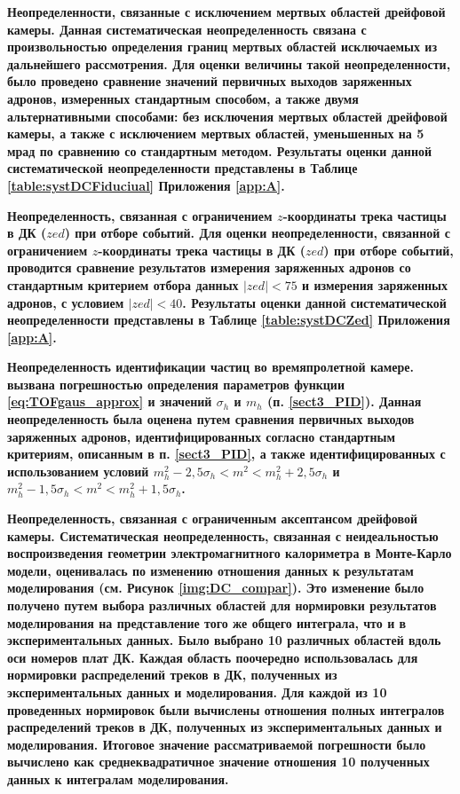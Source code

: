 \bfseries Неопределенности, связанные с исключением мертвых областей дрейфовой камеры. %
\mdseries
Данная систематическая неопределенность связана с произвольностью определения границ мертвых областей исключаемых из дальнейшего рассмотрения. Для оценки величины такой неопределенности, было проведено сравнение значений первичных выходов заряженных адронов, измеренных стандартным способом, а также двумя альтернативными способами: без  исключения мертвых областей дрейфовой камеры, а также с исключением мертвых областей, уменьшенных на 5 мрад по сравнению со стандартным методом. 
Результаты оценки данной систематической неопределенности представлены в Таблице \ref{table:systDCFiduciual} Приложения \ref{app:A}.


\bfseries Неопределенность, связанная с ограничением $z$-координаты трека частицы в ДК ($zed$) при отборе событий. %
\mdseries
Для оценки неопределенности, связанной с ограничением $z$-координаты трека частицы в ДК ($zed$) при отборе событий, проводится сравнение результатов измерения заряженных адронов со стандартным критерием отбора данных $|zed|<75$ и измерения заряженных адронов, с условием $|zed|<40$. 
Результаты оценки данной систематической неопределенности представлены в Таблице \ref{table:systDCZed} Приложения \ref{app:A}.

\bfseries Неопределенность идентификации частиц во времяпролетной камере.
\mdseries
вызвана погрешностью определения параметров функции \ref{eq:TOFgaus_approx} и значений  $\sigma_h$ и $m_h$ (п. \ref{sect3_PID}). Данная неопределенность была оценена путем сравнения первичных выходов заряженных адронов, идентифицированных согласно стандартным критериям, описанным в п. \ref{sect3_PID}, а также идентифицированных с использованием условий $ m^2_h -2,5\sigma_h < m^2 < m^2_h +2,5\sigma_h $ и  $ m^2_h -1,5\sigma_h < m^2 < m^2_h +1,5\sigma_h $.

\bfseries Неопределенность, связанная с ограниченным аксептансом дрейфовой камеры.
\mdseries
Систематическая неопределенность, связанная с неидеальностью воспроизведения геометрии электромагнитного калориметра в Монте-Карло модели, оценивалась по изменению отношения данных к результатам моделирования (см.  Рисунок \ref{img:DC_compar}). Это изменение было получено путем выбора различных областей для нормировки результатов моделирования на представление того же общего интеграла, что и в экспериментальных данных. Было выбрано 10 различных областей вдоль оси номеров плат ДК. Каждая область поочередно использовалась для нормировки распределений треков в ДК, полученных из экспериментальных данных и моделирования. Для каждой из 10 проведенных нормировок были вычислены отношения полных интегралов распределений треков в ДК, полученных из экспериментальных данных и моделирования. Итоговое значение рассматриваемой погрешности было вычислено как среднеквадратичное значение отношения 10 полученных данных к интегралам моделирования. 

